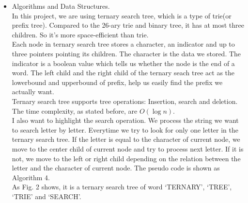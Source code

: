 \begin{itemize}
\item{Algorithms and Data Structures. } \\
In this project, we are using ternary search tree, which is a type of trie(or prefix tree). Compared to the 26-ary trie and binary tree, it has at most three children. So it's more space-efficient than trie. \\
Each node in ternary search tree stores a character, an indicator and up to three pointers pointing its children. The character is the data we stored. The indicator is a boolean value which tells us whether the node is the end of a word. The left child and the right child of the ternary seach tree act as the lowerbound and upperbound of prefix, help us easily find the prefix we actually want. \\
Ternary search tree supports tree operations: Insertion, search and deletion. The time complexity, as stated before, are $ O(\log n) $. \\
I also want to highlight the search operation. We process the string we want to search letter by letter. Everytime we try to look for only one letter in the ternary search tree. If the letter is equal to the character of current node, we move to the center child of current node and try to process next letter. If it is not, we move to the left or right child depending on the relation between the letter and the character of current node. The pseudo code is shown as Algorithm 4. \\
As Fig. 2 shows, it is a ternary search tree of word `TERNARY', `TREE', `TRIE' and `SEARCH'. 
\begin{figure}[H]
	\label{fig:tst}
	\centering

\end{figure}
\end{itemize}
